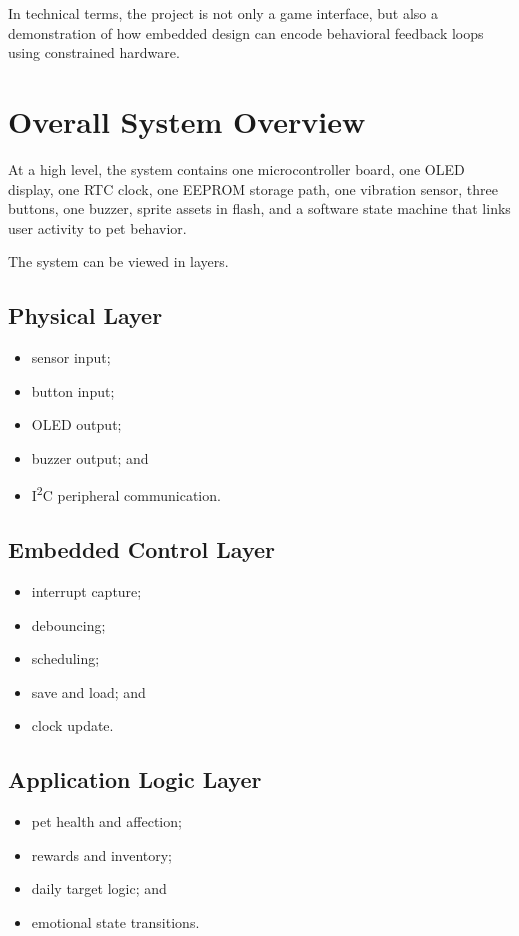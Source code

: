 \documentclass[conference]{IEEEtran}
\begin{document}
In technical terms, the project is not only a game interface, but also a demonstration of how embedded design can encode behavioral feedback loops using constrained hardware.

\section{Overall System Overview}
At a high level, the system contains one microcontroller board, one OLED display, one RTC clock, one EEPROM storage path, one vibration sensor, three buttons, one buzzer, sprite assets in flash, and a software state machine that links user activity to pet behavior.

The system can be viewed in layers.

\subsection{Physical Layer}
\begin{itemize}
\item sensor input;
\item button input;
\item OLED output;
\item buzzer output; and
\item I\textsuperscript{2}C peripheral communication.
\end{itemize}

\subsection{Embedded Control Layer}
\begin{itemize}
\item interrupt capture;
\item debouncing;
\item scheduling;
\item save and load; and
\item clock update.
\end{itemize}

\subsection{Application Logic Layer}
\begin{itemize}
\item pet health and affection;
\item rewards and inventory;
\item daily target logic; and
\item emotional state transitions.
\end{itemize}
\end{document}
